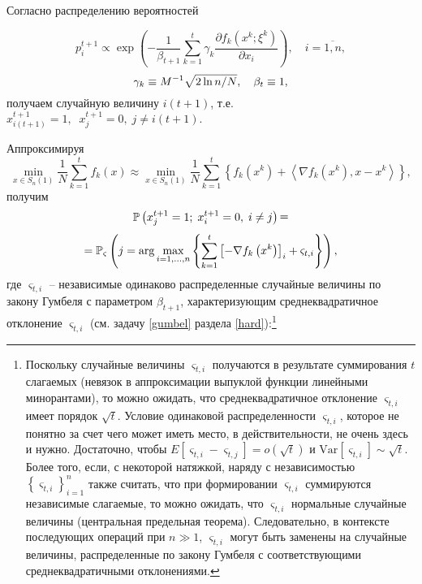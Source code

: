 \noindent Согласно распределению вероятностей

\[
p_i^{t+1} \propto \exp \left( {-\frac{1}{\beta _{t+1} }\sum\limits_{k=1}^t 
{\gamma _k \frac{\partial f_k \left( {x^k;\xi ^k} \right)}{\partial x_i }} } 
\right),\quad i=\overline{1,n},
\]
\[
\gamma _k \equiv M^{-1}\sqrt {{2\ln n} \mathord{\left/ {\vphantom {{2\ln n} 
N}} \right. \kern-\nulldelimiterspace} N} ,
\quad
\beta _t \equiv 1,
\]
получаем случайную величину 
$i\left( {t+1} \right)$, т.е. \\ $x_{i\left( {t+1} \right)}^{t+1} =1,\;\;x_j^{t+1} 
=0,\;j\ne i\left( {t+1} \right).$

Аппроксимируя
\[
\mathop {\min }
\limits_{x\in S_n \left( 1 \right)} 
\frac{1}{N}
\sum_{k=1}^t 
f_k \left( x \right) \approx \mathop {\min} \limits_{x\in S_n \left( 1 \right)}  
\frac{1}{N}\sum\limits_{k=1}^t 
\left\{ 
  f_k \left( x^k  \right)+
  \left\langle \nabla f_k \left( {x^k } 
   \right),x-x^k  \right\rangle  
\right\} ,
\]
получим
\[
\mathrm{{\mathbb P}}\left( {x_j^{t+1} =1;\;x_i^{t+1} =0,\;i\ne j} \right)\mathop =
\]
\[ 
= \mathrm{{\mathbb P}}_\varsigma \left( {j=\arg \mathop {\max }\limits_{i=1,...,n} \left\{ 
{\sum\limits_{k=1}^t {\left[ {-\nabla f_k \left( {x^k } \right)} \right]_i 
+\varsigma _{t,i} } } \right\}} \right),
\]
где $\varsigma _{t,i} $ -- независимые одинаково распределенные случайные 
величины по закону Гумбеля с параметром $\beta _{t+1} $, характеризующим 
среднеквадратичное отклонение $\varsigma _{t,i} $ (см. задачу \ref{gumbel} раздела 
\ref{hard}):\footnote{ Поскольку случайные величины $\varsigma _{t,i} $ получаются в 
результате суммирования $t$ слагаемых (невязок в аппроксимации выпуклой 
функции линейными минорантами), то можно ожидать, что среднеквадратичное 
отклонение $\varsigma _{t,i} $ имеет порядок $\sqrt t $. Условие одинаковой 
распределенности $\varsigma _{t,i} $, которое не понятно за счет чего может 
иметь место, в действительности, не очень здесь и нужно. Достаточно, чтобы 
$E\left[ {\varsigma _{t,i} -\varsigma _{t,j} } \right]=o\left( {\sqrt t } 
\right)$ и $\mbox{Var}\left[ {\varsigma _{t,i} } \right]\sim \sqrt t $. 
Более того, если, с некоторой натяжкой, наряду с независимостью $\left\{ 
{\varsigma _{t,i} } \right\}_{i=1}^n $ также считать, что при формировании 
$\varsigma _{t,i} $ суммируются независимые слагаемые, то можно ожидать, что 
$\varsigma _{t,i} $ нормальные случайные величины (центральная предельная 
теорема). Следовательно, в контексте последующих операций при $n\gg 1$, 
$\varsigma _{t,i} $ могут быть заменены на случайные величины, 
распределенные по закону Гумбеля с соответствующими среднеквадратичными 
отклонениями. }
